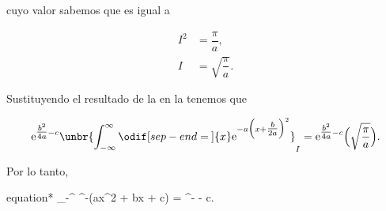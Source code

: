 \documentclass[../main.tex]{subfiles}
\begin{document}
\begin{problema}
	cuyo valor sabemos que es igual a

	\begin{align}
		I^{2} & = \dfrac{\pi}{a},\nonumber                   \\
		I     & = \sqrt{\dfrac{\pi}{a}}.\label{eq:int_value}
	\end{align}

	Sustituyendo el resultado de la  en la
	 tenemos que

	\begin{equation*}
		\mathrm{e}^{\tfrac{b^{2}}{4a} - c}\unbr{\int_{-\infty}^{\infty}\odif[sep-end=\medspace]{x} \mathrm{e}^{-a \Bigl(x + \tfrac{b}{2a}\Bigr)^{2}}}_{I} = \mathrm{e}^{\tfrac{b^{2}}{4a} - c}\Bigl(\sqrt{\dfrac{\pi}{a}}\Bigr).
	\end{equation*}

	Por lo tanto,

	\begin{empheq}[box = \mainresult]{equation*}
		\int_{-\infty}^{\infty} ^{-(ax^{2} + bx + c)} =
		^{- - c}.
	\end{empheq}
\end{problema}
\end{document}
